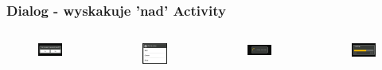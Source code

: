 \begin{frame}\frametitle{Dialog - wyskakuje 'nad' Activity}
\begin{columns}
  \begin{figure}
   \centering
   \includegraphics[width=.7\textwidth]{images/dialog_buttons}
  \end{figure}
  \begin{figure}
   \centering
   \includegraphics[width=.7\textwidth]{images/dialog_list}
  \end{figure}
 \begin{figure}
   \centering
   \includegraphics[width=.7\textwidth]{images/dialog_progress_spinning}
  \end{figure}
  \begin{figure}
   \centering
   \includegraphics[width=.7\textwidth]{images/dialog_progress_bar}
  \end{figure}
\end{columns}
\end{frame}

